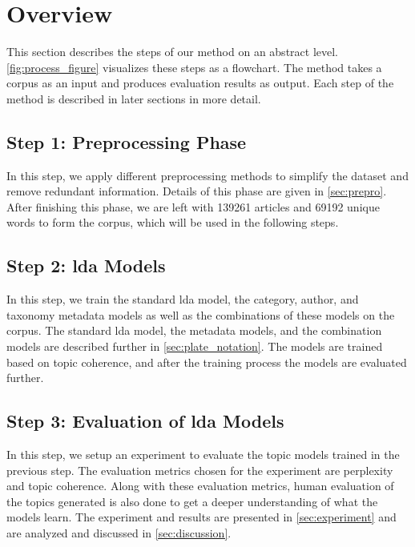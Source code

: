 \section{Overview}\label{sec:overview}
This section describes the steps of our method on an abstract level.
\autoref{fig:process_figure} visualizes these steps as a flowchart.
The method takes a corpus as an input and produces evaluation results as output.
Each step of the method is described in later sections in more detail.

\subsection*{Step 1: Preprocessing Phase}
In this step, we apply different preprocessing methods to simplify the dataset and remove redundant information.
Details of this phase are given in \autoref{sec:prepro}.
After finishing this phase, we are left with 139261 articles and 69192 unique words to form the corpus, which will be used in the following steps.

\subsection*{Step 2: \Gls{lda} Models}
In this step, we train the standard \gls{lda} model, the category, author, and taxonomy metadata models as well as the combinations of these models on the corpus.
The standard \gls{lda} model, the metadata models, and the combination models are described further in \autoref{sec:plate_notation}.
The models are trained based on topic coherence, and after the training process the models are evaluated further.

\subsection*{Step 3: Evaluation of \gls{lda} Models}
In this step, we setup an experiment to evaluate the topic models trained in the previous step.
The evaluation metrics chosen for the experiment are perplexity and topic coherence.
Along with these evaluation metrics, human evaluation of the topics generated is also done to get a deeper understanding of what the models learn.
The experiment and results are presented in \autoref{sec:experiment} and are analyzed and discussed in \autoref{sec:discussion}.



